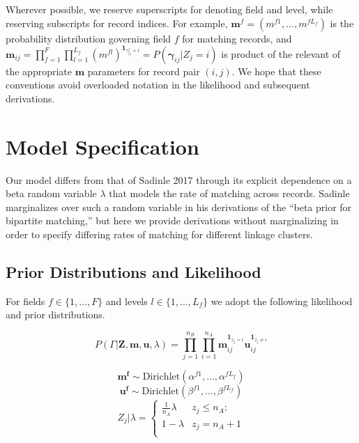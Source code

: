 \documentclass[
  12pt,
]{article}
\begin{document}
Wherever possible, we reserve superscripts for denoting field and level,
while reserving subscripts for record indices. For example,
\(\mathbf{m}^f = (m^{f1}, \ldots, m^{fL_f})\) is the probability
distribution governing field \(f\) for matching records, and
\(\mathbf{m}_{ij}= \prod_{f=1}^{F}\prod_{l=1}^{L_f} \left(m^{fl}\right)^{\mathbf{1}_{\gamma_{ij}^f = l}} = P(\boldsymbol{\gamma}_{ij}|Z_j = i)\)
is product of the relevant of the appropriate \(\mathbf{m}\) parameters
for record pair \((i,j)\). We hope that these conventions avoid
overloaded notation in the likelihood and subsequent derivations.

\hypertarget{model-specification}{%
\section{Model Specification}\label{model-specification}}

Our model differs from that of Sadinle 2017 through its explicit
dependence on a beta random variable \(\lambda\) that models the rate of
matching across records. Sadinle marginalizes over such a random
variable in his derivations of the ``beta prior for bipartite
matching,'' but here we provide derivations without marginalizing in
order to specify differing rates of matching for different linkage
clusters.

\hypertarget{prior-distributions-and-likelihood}{%
\subsection{Prior Distributions and
Likelihood}\label{prior-distributions-and-likelihood}}

For fields \(f \in \{1, \ldots, F\}\) and levels
\(l\in \{1, \ldots, L_f\}\) we adopt the following likelihood and prior
distributions.

\[P(\Gamma|\mathbf{Z}, \mathbf{m}, \mathbf{u}, \lambda) =\prod_{j=1}^{n_B}  \prod_{i=1}^{n_A}\mathbf{m}_{ij}^{\mathbf{1}_{z_j = i}}\mathbf{u}_{ij}^{\mathbf{1}_{z_j \neq i}}\]

\[\mathbf{m^{f}} \sim \text{Dirichlet}(\alpha^{f1}, \ldots, \alpha^{fL_f})\]
\[\mathbf{u^{f}} \sim \text{Dirichlet}(\beta^{f1}, \ldots, \beta^{fL_f})\]
\[Z_j | \lambda =
\begin{cases} 
    \frac{1}{n_A}\lambda  & z_j \leq n_A; \\
     1-\lambda &  z_j  = n_A + 1 \\
\end{cases}\]
\end{document}
